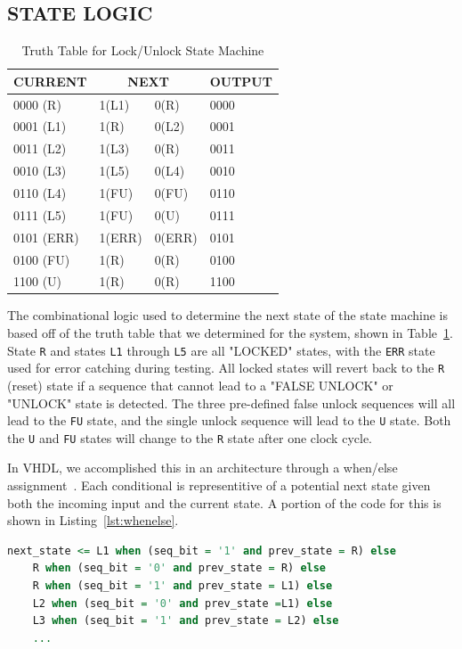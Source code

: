 \documentclass[paper=a4, fontsize=11pt,twoside]{scrartcl}
\begin{document}
	\subsection{STATE LOGIC} %
	\label{sub:state_logic}
	\begin{table}[h]
		\caption{Truth Table for Lock/Unlock State Machine}
		\label{tab:truth}
		\centering
	
		\begin{tabular}{l | l l | l}
		\hline
		\hline
		\textbf{CURRENT} & \multicolumn{2}{c|}{\textbf{NEXT}} & \textbf{OUTPUT} \\
		\hline
		0000 (R) & 1(L1) & 0(R) & 0000 \\
		0001 (L1) & 1(R) & 0(L2) & 0001 \\
		0011 (L2) & 1(L3) & 0(R) & 0011 \\
		0010 (L3) & 1(L5) & 0(L4) & 0010 \\
		0110 (L4) & 1(FU) & 0(FU) & 0110 \\
		0111 (L5) & 1(FU) & 0(U) & 0111 \\
		0101 (ERR) & 1(ERR) & 0(ERR) & 0101	\\
		0100 (FU) & 1(R) & 0(R) & 0100 \\
		1100 (U) & 1(R) & 0(R) & 1100 \\
		\hline
		\end{tabular}
	\end{table}
	The combinational logic used to determine the next state of the state machine is based off of the truth table that we determined for the system, shown in Table~\ref{tab:truth}. State \texttt{R} and states \texttt{L1} through \texttt{L5} are all "LOCKED" states, with the \texttt{ERR} state used for error catching during testing. All locked states will revert back to the \texttt{R} (reset) state if a sequence that cannot lead to a "FALSE UNLOCK" or "UNLOCK" state is detected. The three pre-defined false unlock sequences will all lead to the \texttt{FU} state, and the single unlock sequence will lead to the \texttt{U} state. Both the \texttt{U} and \texttt{FU} states will change to the \texttt{R} state after one clock cycle.

	In VHDL, we accomplished this in an architecture through a when/else assignment~\cite{signal}. Each conditional is representitive of a potential next state given both the incoming input and the current state. A portion of the code for this is shown in Listing~\ref{lst:whenelse}.

	\begin{oframed}
	\begin{lstlisting}[caption={Next State Code},label={lst:whenelse},language=VHDL]
next_state <= L1 when (seq_bit = '1' and prev_state = R) else
	R when (seq_bit = '0' and prev_state = R) else
	R when (seq_bit = '1' and prev_state = L1) else
	L2 when (seq_bit = '0' and prev_state =L1) else
	L3 when (seq_bit = '1' and prev_state = L2) else
	...
	\end{lstlisting}
	\end{oframed}
\end{document}
